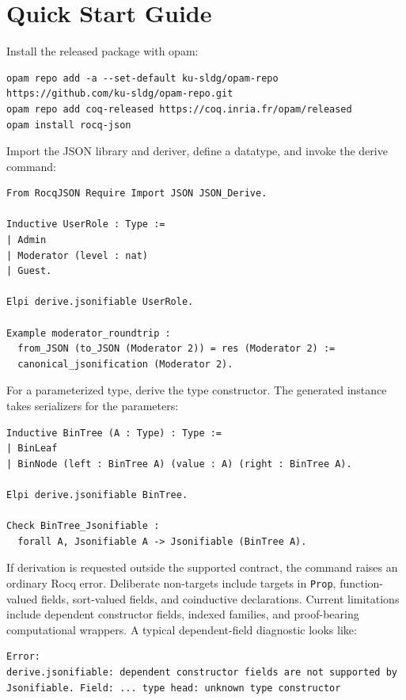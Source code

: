 \section{Quick Start Guide}
\label{app:quickstart}

Install the released package with opam:

\begin{lstlisting}
opam repo add -a --set-default ku-sldg/opam-repo https://github.com/ku-sldg/opam-repo.git
opam repo add coq-released https://coq.inria.fr/opam/released
opam install rocq-json
\end{lstlisting}

Import the JSON library and deriver, define a datatype, and invoke the derive
command:

\begin{lstlisting}[language=Coq]
From RocqJSON Require Import JSON JSON_Derive.

Inductive UserRole : Type :=
| Admin
| Moderator (level : nat)
| Guest.

Elpi derive.jsonifiable UserRole.

Example moderator_roundtrip :
  from_JSON (to_JSON (Moderator 2)) = res (Moderator 2) :=
  canonical_jsonification (Moderator 2).
\end{lstlisting}

For a parameterized type, derive the type constructor.  The generated instance
takes serializers for the parameters:

\begin{lstlisting}[language=Coq]
Inductive BinTree (A : Type) : Type :=
| BinLeaf
| BinNode (left : BinTree A) (value : A) (right : BinTree A).

Elpi derive.jsonifiable BinTree.

Check BinTree_Jsonifiable :
  forall A, Jsonifiable A -> Jsonifiable (BinTree A).
\end{lstlisting}

If derivation is requested outside the supported contract, the command raises an
ordinary Rocq error.  Deliberate non-targets include targets in \texttt{Prop},
function-valued fields, sort-valued fields, and coinductive declarations.
Current limitations include dependent constructor fields, indexed families, and
proof-bearing computational wrappers.  A typical dependent-field diagnostic
looks like:

\begin{lstlisting}
Error:
derive.jsonifiable: dependent constructor fields are not supported by
Jsonifiable. Field: ... type head: unknown type constructor
\end{lstlisting}
